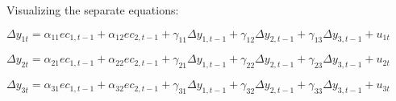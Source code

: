 \documentclass[10pt, a4paper, landscape]{article}
\begin{document}
\begin{multicols}{2}
		Visualizing the separate equations:
		
		\begin{center}
			$\Delta y_{1t} = \alpha_{11} ec_{1, t - 1} + \alpha_{12} ec_{2, t - 1}  + \gamma_{11} \Delta y_{1, t - 1} + \gamma_{12} \Delta y_{2, t - 1} + \gamma_{13} \Delta y_{3, t - 1} + u_{1t}$
			
			$\Delta y_{2t} = \alpha_{21} ec_{1, t - 1} + \alpha_{22} ec_{2, t - 1}  + \gamma_{21} \Delta y_{1, t - 1} + \gamma_{22} \Delta y_{2, t - 1} + \gamma_{23} \Delta y_{3, t - 1} + u_{2t}$
			
			$\Delta y_{3t} = \alpha_{31} ec_{1, t - 1} + \alpha_{32} ec_{2, t - 1}  + \gamma_{31} \Delta y_{1, t - 1} + \gamma_{32} \Delta y_{2, t - 1} + \gamma_{33} \Delta y_{3, t - 1} + u_{3t}$
		\end{center}
	\end{multicols}
\end{document}
